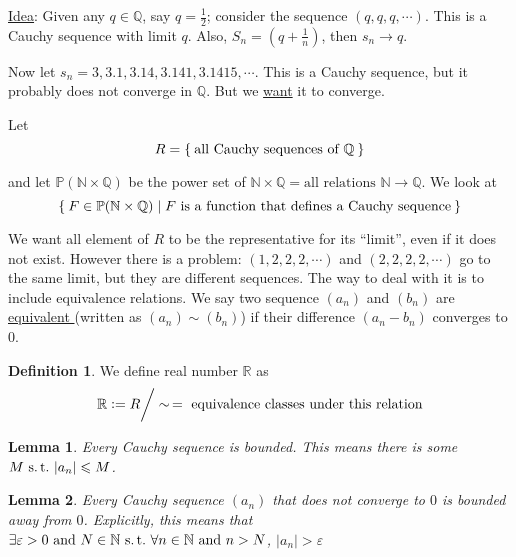 \documentclass[12pt]{amsart}
\newcommand{\bbR}{\mathbb{R}}
\newcommand{\bbN}{\mathbb{N}}
\newcommand{\bbQ}{\mathbb{Q}}
\newcommand{\bbP}{\mathbb{P}}
\newcommand{\suchthat}{\operatorname{\thinspace s.t. \thinspace}}
\theoremstyle{plain}
\newtheorem*{lem}{Lemma}
\theoremstyle{remark}
\theoremstyle{definition}
\newtheorem*{define}{Definition}
\begin{document}
\ul{Idea}: Given any $q\in \bbQ$, say $q = \frac{1}{2}$; consider the sequence $(q,q,q,\cdots)$. This is a Cauchy sequence with limit $q$.
Also, $S_n = (q + \frac{1}{n})$, then $s_n \rightarrow q$.
\par
Now let $s_n = 3,3.1,3.14,3.141,3.1415,\cdots$. This is a Cauchy sequence, but it probably does not converge in $\bbQ$. But we \ul{want} it to converge.

\par
Let 
\begin{equation*}
	R = \Set{\mbox{all Cauchy sequences of } \bbQ}
\end{equation*}

\noindent and let $\bbP(\bbN \times \bbQ)$ be the power set of $\bbN \times \bbQ = \mbox{all relations } \bbN \rightarrow \bbQ$. We look at 
\begin{equation*}
	\Set{F \in \bbP(\bbN \times \bbQ) | F \mbox{ is a function that defines a Cauchy sequence}}
\end{equation*}

We want all element of $R$ to be the representative for its ``limit'', even if it does not exist. However there is a problem: $(1,2,2,2,\cdots)$ and $(2,2,2,2,\cdots)$ go to the same limit, but they are different sequences.
The way to deal with it is to include equivalence relations. We say two sequence $(a_n)$ and $(b_n)$ are \ul{equivalent } (written as $(a_n) \sim (b_n)$) if their difference $(a_n - b_n)$ converges to $0$. 

\begin{define}
	We define real number $\bbR$ as
	\begin{equation*}
		\bbR \vcentcolon = R \bigg/\sim\thinspace = \mbox{ equivalence classes under this relation}
	\end{equation*}
\end{define}

\begin{lem}
	Every Cauchy sequence is bounded. This means there is some $M \suchthat |a_n| \leqslant M$.  
\end{lem}
\begin{lem} Every Cauchy sequence $(a_n)$ that does not converge to $0$ is bounded away from $0$. Explicitly, this means that $\exists \varepsilon > 0 \mbox{ and } N \in \bbN \suchthat \forall n \in \bbN \mbox{ and } n > N$, $|a_n| > \varepsilon$  
\end{lem}
\end{document}
